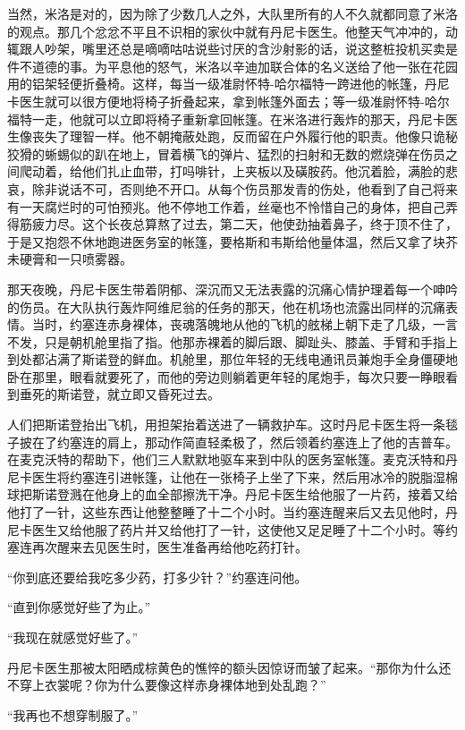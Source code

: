     当然，米洛是对的，因为除了少数几人之外，大队里所有的人不久就都同意了米洛的观点。那几个忿忿不平且不识相的家伙中就有丹尼卡医生。他整天气冲冲的，动辄跟人吵架，嘴里还总是嘀嘀咕咕说些讨厌的含沙射影的话，说这整桩投机买卖是件不道德的事。为平息他的怒气，米洛以辛迪加联合体的名义送给了他一张在花园用的铝架轻便折叠椅。这样，每当一级准尉怀特-哈尔福特一跨进他的帐篷，丹尼卡医生就可以很方便地将椅子折叠起来，拿到帐篷外面去；等一级准尉怀特-哈尔福特一走，他就可以立即将椅子重新拿回帐篷。在米洛进行轰炸的那天，丹尼卡医生像丧失了理智一样。他不朝掩蔽处跑，反而留在户外履行他的职责。他像只诡秘狡猾的蜥蜴似的趴在地上，冒着横飞的弹片、猛烈的扫射和无数的燃烧弹在伤员之间爬动着，给他们扎止血带，打吗啡针，上夹板以及磺胺药。他沉着脸，满脸的悲哀，除非说话不可，否则绝不开口。从每个伤员那发青的伤处，他看到了自己将来有一天腐烂时的可怕预兆。他不停地工作着，丝毫也不怜惜自己的身体，把自己弄得筋疲力尽。这个长夜总算熬了过去，第二天，他使劲抽着鼻子，终于顶不住了，于是又抱怨不休地跑进医务室的帐篷，要格斯和韦斯给他量体温，然后又拿了块芥未硬膏和一只喷雾器。

    那天夜晚，丹尼卡医生带着阴郁、深沉而又无法表露的沉痛心情护理着每一个呻吟的伤员。在大队执行轰炸阿维尼翁的任务的那天，他在机场也流露出同样的沉痛表情。当时，约塞连赤身裸体，丧魂落魄地从他的飞机的舷梯上朝下走了几级，一言不发，只是朝机舱里指了指。他那赤裸着的脚后跟、脚趾头、膝盖、手臂和手指上到处都沾满了斯诺登的鲜血。机舱里，那位年轻的无线电通讯员兼炮手全身僵硬地卧在那里，眼看就要死了，而他的旁边则躺着更年轻的尾炮手，每次只要一睁眼看到垂死的斯诺登，就立即又昏死过去。

    人们把斯诺登抬出飞机，用担架抬着送进了一辆救护车。这时丹尼卡医生将一条毯子披在了约塞连的肩上，那动作简直轻柔极了，然后领着约塞连上了他的吉普车。在麦克沃特的帮助下，他们三人默默地驱车来到中队的医务室帐篷。麦克沃特和丹尼卡医生将约塞连引进帐篷，让他在一张椅子上坐了下来，然后用冰冷的脱脂湿棉球把斯诺登溅在他身上的血全部擦洗干净。丹尼卡医生给他服了一片药，接着又给他打了一针，这些东西让他整整睡了十二个小时。当约塞连醒来后又去见他时，丹尼卡医生又给他服了药片并又给他打了一针，这使他又足足睡了十二个小时。等约塞连再次醒来去见医生时，医生准备再给他吃药打针。

    “你到底还要给我吃多少药，打多少针？”约塞连问他。

    “直到你感觉好些了为止。”

    “我现在就感觉好些了。”

    丹尼卡医生那被太阳晒成棕黄色的憔悴的额头因惊讶而皱了起来。“那你为什么还不穿上衣裳呢？你为什么要像这样赤身裸体地到处乱跑？”

    “我再也不想穿制服了。”

